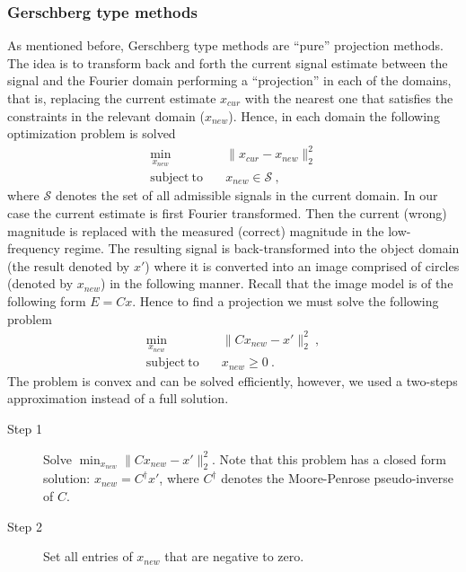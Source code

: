 \subsubsection{Gerschberg type methods}
\label{sec:gerschb-type-meth}
As mentioned before, Gerschberg type methods are ``pure'' projection
methods. The idea is to transform back and forth the current signal
estimate between the signal and the Fourier domain 
performing a ``projection'' in each of the domains, that is, replacing
the current estimate $x_{cur}$ with 
the nearest one that satisfies the constraints in the relevant
domain ($x_{new}$).
Hence, in each domain the
following optimization problem is solved
\begin{equation}
  \label{eq:sparse-6}
  \begin{split}
    \min_{x_{new}} & \quad \|x_{cur} - x_{new}\|_{2}^{2}\\
    \mathrm{subject\ to} & \quad x_{new} \in \mathcal{S} \ ,
  \end{split}
\end{equation}
where $\mathcal{S}$ denotes the set of all admissible signals in the
current domain. In our case the current estimate is first Fourier
transformed. Then the current (wrong) magnitude is replaced with the
measured (correct) magnitude in the low-frequency regime. The resulting
signal is back-transformed into the object domain (the result
denoted by $x'$) where it is converted into an image comprised of
circles (denoted by $x_{new}$) in the following manner. Recall that
the image model is of the following form $E = Cx$. Hence to find a
projection we must solve the following problem
\begin{equation}
  \label{eq:sparse-7}
  \begin{split}
    \min_{x_{new}} &\quad \|Cx_{new} - x'\|_{2}^{2}\ ,\\
    \mathrm{subject\ to} &\quad x_{new} \geq 0 \ .
  \end{split}
\end{equation}
The problem is convex and can be solved efficiently, however, we
used a two-steps approximation instead of a full solution.
\begin{description}
\item[Step 1] Solve $\min_{x_{new}}  \|Cx_{new} - x'\|_{2}^{2}$. Note that
  this problem has a closed form solution: $x_{new} = C^{\dagger}x'$,
  where $C^{\dagger}$ denotes the Moore-Penrose pseudo-inverse of $C$.
\item[Step 2] Set all entries of $x_{new}$ that are negative to zero.
\end{description}

